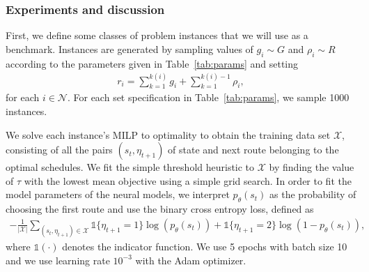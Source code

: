 \documentclass{article}
\theoremstyle{definition}
\theoremstyle{plain}
\begin{document}
%



\subsubsection{Experiments and discussion}

First, we define some classes of problem instances that we will use as a benchmark.
%
Instances are generated by sampling values of $g_{i} \sim G$ and $\rho_{i} \sim R$ according
to the parameters given in Table~\ref{tab:params} and setting
\begin{align*}
  r_{i} = \sum_{k=1}^{k(i)} g_{i} + \sum_{k=1}^{k(i) - 1} \rho_{i} ,
\end{align*}
for each $i \in \mathcal{N}$.
%
For each set specification in Table~\ref{tab:params}, we sample 1000 instances.

We solve each instance's MILP to optimality to obtain the training data set
$\mathcal{X}$, consisting of all the pairs $(s_{t}, \eta_{t+1})$ of state and next
route belonging to the optimal schedules.
We fit the simple threshold heuristic to $\mathcal{X}$ by finding the value of
$\tau$ with the lowest mean objective using a simple grid search.
%
%
In order to fit the model parameters of the neural models, we interpret
$p_{\theta}(s_{t})$ as the probability of choosing the first route and use the
binary cross entropy loss, defined as
\begin{align*}
  - \frac{1}{|\mathcal{X}|} \sum_{(s_{t}, \eta_{t+1}) \in \mathcal{X}} \mathds{1}\{\eta_{t+1} = 1\} \log(p_{\theta}(s_{t})) + \mathds{1}\{\eta_{t+1} = 2\} \log(1 - p_{\theta}(s_{t})) ,
\end{align*}
where $\mathds{1}(\cdot)$ denotes the indicator function.
%
We use 5 epochs with batch size 10 and we use learning rate $10^{-3}$ with the
Adam optimizer.
\end{document}
